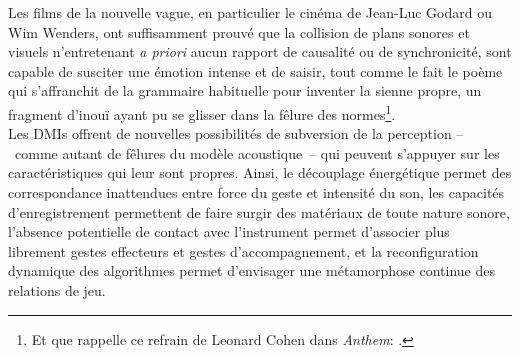 \indent Les films de la nouvelle vague, en particulier le cinéma de Jean-Luc Godard ou Wim Wenders, ont suffisamment prouvé que la collision de plans sonores et visuels n'entretenant \textit{a priori} aucun rapport de causalité ou de synchronicité, sont capable de susciter une émotion intense et de saisir, tout comme le fait le poème qui s'affranchit de la grammaire habituelle pour inventer la sienne propre, un fragment d'inouï ayant pu se glisser dans la fêlure des normes\footnote{Et que rappelle ce refrain de Leonard Cohen dans \textit{Anthem}: .}.\\
\indent Les \glspl{DMI} offrent de nouvelles possibilités de subversion de la perception --~comme autant de fêlures du modèle acoustique~-- qui peuvent s'appuyer sur les caractéristiques qui leur sont propres. Ainsi, le découplage énergétique permet des correspondance inattendues entre force du geste et intensité du son, les capacités d'enregistrement permettent de faire surgir des matériaux de toute nature sonore, l'absence potentielle de contact avec l'instrument permet d'associer plus librement gestes effecteurs et gestes d'accompagnement, et la reconfiguration dynamique des algorithmes permet d'envisager une métamorphose continue des relations de jeu.\\

